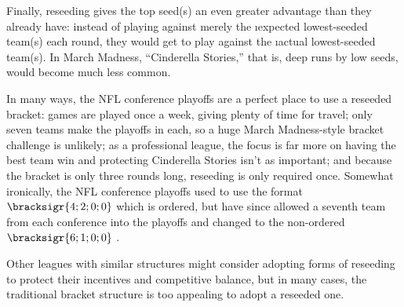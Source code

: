{    Finally, reseeding gives the top seed(s) an even greater advantage than they already have: instead of playing against merely the \i{expected} lowest-seeded team(s) each round, they would get to play against the \i{actual} lowest-seeded team(s). In March Madness, ``Cinderella Stories,'' that is, deep runs by low seeds, would become much less common.

    In many ways, the NFL conference playoffs are a perfect place to use a reseeded bracket: games are played once a week, giving plenty of time for travel; only seven teams make the playoffs in each, so a huge March Madness-style bracket challenge is unlikely; as a professional league, the focus is far more on having the best team win and protecting Cinderella Stories isn't as important; and because the bracket is only three rounds long, reseeding is only required once. Somewhat ironically, the NFL conference playoffs used to use the format $\bracksigr{4;2;0;0}$ which is ordered, but have since allowed a seventh team from each conference into the playoffs and changed to the non-ordered $\bracksigr{6;1;0;0}$ \cite{stor_nfl_exp}.

    Other leagues with similar structures might consider adopting forms of reseeding to protect their incentives and competitive balance, but in many cases, the traditional bracket structure is too appealing to adopt a reseeded one.
    }